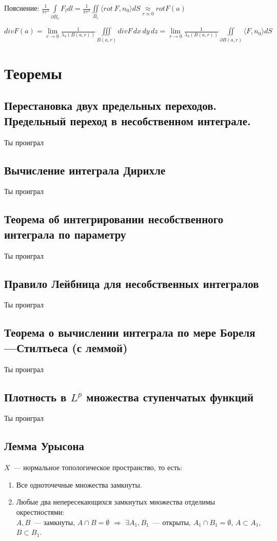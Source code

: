 \documentclass[paper=a4, fontsize=14pt]{report}
\begin{document}
	Пояснение: $ \frac{1}{\pi r^2} \int\limits_{\partial B_r} F_ldl =  \frac{1}{\pi r^2} \iint\limits_{B_r} \langle rot\ F, n_0 \rangle dS \underset{r \approx 0}{\approx} rot F(a)$
	


	$div F(a) = \lim\limits_{r\to 0} \frac{1}{\lambda_3(B(a,r))} \iiint\limits_{B(a,r)} div F \,dx\,dy\,dz = \lim\limits_{r\to 0} \frac{1}{\lambda_3(B(a,r))} \iint\limits_{\partial B(a,r)} \langle F, n_0 \rangle dS$

\chapter{Теоремы}
    \section{Перестановка двух предельных переходов. Предельный переход в несобственном интеграле.}
    Ты проиграл

    \section{Вычисление интеграла Дирихле}
    Ты проиграл

    \section{Теорема об интегрировании несобственного интеграла по параметру}
    Ты проиграл

    \section{Правило Лейбница для несобственных интегралов}
    Ты проиграл

    \section{Теорема о вычислении интеграла по мере Бореля---Стилтьеса (с леммой)}
    Ты проиграл

    \section{Плотность в $L^p$ множества ступенчатых функций}
    Ты проиграл

    \section{Лемма Урысона}
    $X$~--- нормальное топологическое пространство, то есть:
    \begin{enumerate}
        \item Все одноточечные множества замкнуты.
        \item Любые два непересекающихся замкнутых множества отделимы окрестностями:\\
        $A,B$~--- замкнуты, $A \cap B = \emptyset$ $\Rightarrow$ $\exists A_1,B_1$~--- открыты, $A_1 \cap B_1 = \emptyset$,
        $A \subset A_1$, $B \subset B_1$.
    \end{enumerate}
\end{document}
